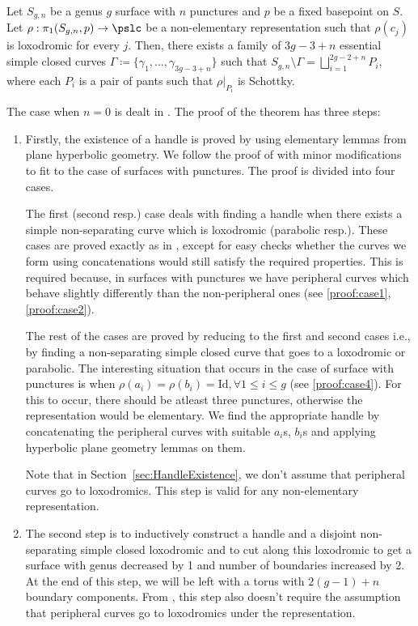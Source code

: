 \begin{theorem}
	Let $S_{g,n}$ be a genus $g$ surface with $n$ punctures and $p$ be a fixed basepoint on $S$. Let $\rho: \pi_1(S_{g,n},p) \rightarrow \pslc$ be a non-elementary representation such that $\rho(c_j)$ is loxodromic for every $j$. Then, there exists a family of $3g - 3 + n$ essential simple closed curves $\Gamma \coloneqq \{\gamma_1, \ldots, \gamma_{3g-3+n}\}$ such that $S_{g,n} \setminus \Gamma = \bigsqcup_{i=1}^{2g-2+n} P_i$, where each $P_i$ is a pair of pants such that $\rho|_{P_i}$ is Schottky.
\end{theorem}

The case when $n=0$ is dealt in \cite{GKM}. The proof of the theorem has three steps:
\begin{enumerate}
	\item Firstly, the existence of a handle is proved by using elementary lemmas from plane hyperbolic geometry. We follow the proof of \cite{GKM} with minor modifications to fit to the case of surfaces with punctures. The proof is divided into four cases. 
	
	The first (second resp.) case deals with finding a handle when there exists a simple non-separating curve which is loxodromic (parabolic resp.). These cases are proved exactly as in \cite{GKM}, except for easy checks whether the curves we form using concatenations would still satisfy the required properties. This is required because, in surfaces with punctures we have peripheral curves which behave slightly differently than the non-peripheral ones (see \ref{proof:case1}, \ref{proof:case2}). 
	
	The rest of the cases are proved by reducing to the first and second cases i.e., by finding a non-separating simple closed curve that goes to a loxodromic or parabolic. The interesting situation that occurs in the case of surface with punctures is when $\rho(a_i)=\rho(b_i)=\text{Id}, \forall 1 \leq i \leq g$ (see \ref{proof:case4}). For this to occur, there should be atleast three punctures, otherwise the representation would be elementary. We find the appropriate handle by concatenating the peripheral curves with suitable $a_i$s, $b_i$s and applying hyperbolic plane geometry lemmas on them. 
	
	Note that in Section~\ref{sec:HandleExistence}, we don't assume that peripheral curves go to loxodromics. This step is valid for any non-elementary representation.
		
	\item The second step is to inductively construct a handle and a disjoint non-separating simple closed loxodromic and to cut along this loxodromic to get a surface with genus decreased by 1 and number of boundaries increased by 2. At the end of this step, we will be left with a torus with $2(g-1)+n$ boundary components. From \cite[Section 4]{GKM}, this step also doesn't require the assumption that peripheral curves go to loxodromics under the representation.
	

\end{enumerate}
